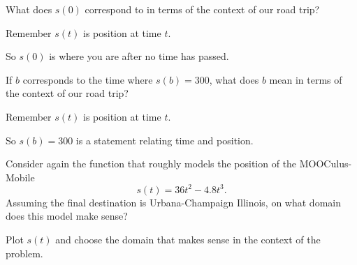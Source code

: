 \documentclass{ximera}
\begin{document}
\begin{problem} %
What does $s(0)$ correspond to in terms of the context of our road
trip?
\begin{hint}
Remember $s(t)$ is position at time $t$.
\end{hint}
\begin{hint}
So $s(0)$ is where you are after no time has passed.
\end{hint}
\begin{prompt} %
  \begin{multipleChoice}
  \end{multipleChoice}
\end{prompt}
\end{problem}

\begin{problem} %
If $b$ corresponds to the time where $s(b) = 300$, what does $b$ mean
in terms of the context of our road trip?
\begin{hint}
Remember $s(t)$ is position at time $t$.
\end{hint}
\begin{hint}
So $s(b)=300$ is a statement relating time and position.  
\end{hint}
\begin{prompt} %
  \begin{multipleChoice}
  \end{multipleChoice}
\end{prompt}
\end{problem}


\begin{problem} %
Consider again the function that roughly models the position of the
MOOCulus-Mobile
\[
s(t) = 36t^2 - 4.8t^3.
\]
Assuming the final destination is Urbana-Champaign Illinois, on what
domain does this model make sense?
\begin{hint}
  Plot $s(t)$ and choose the domain that makes sense in the context of
  the problem.
\end{hint}
\end{problem}
\end{document}
